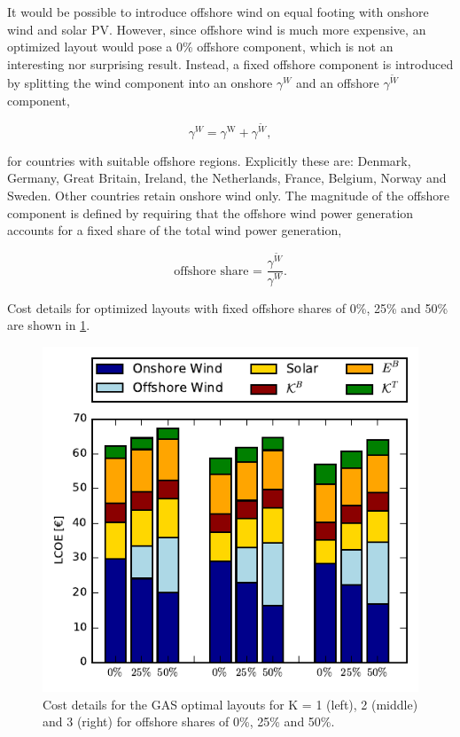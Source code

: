 \documentclass[a4paper, 5p, sort&compress]{elsarticle}%
\begin{document}
It would be possible to introduce offshore wind on equal footing with
onshore wind and solar PV. However, since offshore wind is much more
expensive, an optimized layout would pose a 0\% offshore component,
which is not an interesting nor surprising result. Instead, a fixed
offshore component is introduced by splitting the wind component into
an onshore $\gamma^{W}$ and an offshore $\gamma^{\tilde{W}}$ component,

\begin{equation}
  \label{eq:11}
  \gamma^{W} = \gamma^{\text{W}} + \gamma^{\text{$\tilde{W}$}}, 
\end{equation}

for countries with suitable offshore regions. Explicitly these are:
Denmark, Germany, Great Britain, Ireland, the Netherlands, France,
Belgium, Norway and Sweden. Other countries retain onshore wind
only. The magnitude of the offshore component is defined by requiring
that the offshore wind power generation accounts for a fixed share of
the total wind power generation,

\begin{equation}
  \label{eq:12}
  \text{offshore share = }\frac{\gamma^{\tilde{W}}}{\gamma^{W}}.
\end{equation}

Cost details for optimized layouts with fixed offshore shares of 0\%, 25\% and
50\% are shown in \cref{fig:cost-offshore}.

\begin{figure}[h!]
  \centering
  \includegraphics[width = \columnwidth]{costOffshoreVE50}
  \caption{Cost details for the GAS optimal layouts for K = 1 (left),
    2 (middle) and 3 (right) for offshore shares of 0\%, 25\% and 50\%.}
  \label{fig:cost-offshore}
\end{figure}
\end{document}
